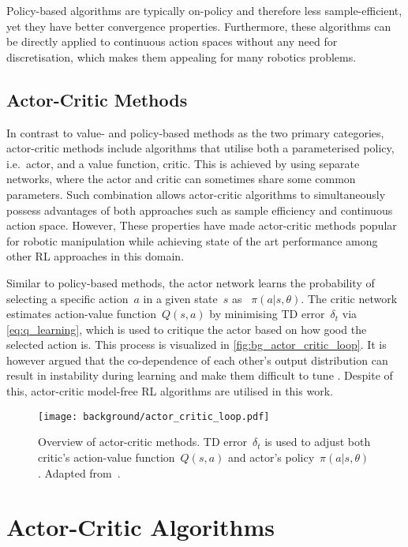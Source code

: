 Policy-based algorithms are typically on-policy and therefore less sample-efficient, yet they have better convergence properties. Furthermore, these algorithms can be directly applied to continuous action spaces without any need for discretisation, which makes them appealing for many robotics problems.


\subsection{Actor-Critic Methods}

In contrast to value- and policy-based methods as the two primary categories, actor-critic methods include algorithms that utilise both a parameterised policy, i.e.~actor, and a value function, critic. This is achieved by using separate networks, where the actor and critic can sometimes share some common parameters. Such combination allows actor-critic algorithms to simultaneously possess advantages of both approaches such as sample efficiency and continuous action space. However, These properties have made actor-critic methods popular for robotic manipulation while achieving state of the art performance among other RL approaches in this domain.

Similar to policy-based methods, the actor network learns the probability of selecting a specific action~\(a\) in a given state~\(s\) as ~\(\pi(a \vert s, \theta)\). The critic network estimates action-value function~\(Q(s, a)\) by minimising TD error~\(\delta_{t}\) via \autoref{eq:q_learning}, which is used to critique the actor based on how good the selected action is. This process is visualized in \autoref{fig:bg_actor_critic_loop}. It is however argued that the co-dependence of each other's output distribution can result in instability during learning and make them difficult to tune \cite{quillen_deep_2018}. Despite of this, actor-critic model-free RL algorithms are utilised in this work.

\begin{figure}[ht]
    \centering
    \texttt{[image: background/actor\_critic\_loop.pdf]}
    \caption{Overview of actor-critic methods. TD error~\(\delta_{t}\) is used to adjust both critic's action-value function~\(Q(s, a)\) and actor's policy~\(\pi(a \vert s, \theta)\). Adapted from~\protect\citet{sutton_reinforcement_2018}.}
    \label{fig:bg_actor_critic_loop}
\end{figure}


\section{Actor-Critic Algorithms}

